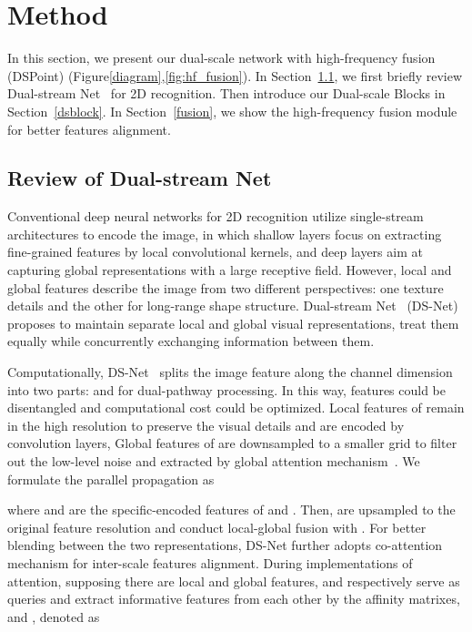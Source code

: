 \documentclass[sigconf]{acmart}
\begin{document}
\section{Method}
\label{sec:method}
In this section, we present our dual-scale network with high-frequency fusion (DSPoint) (Figure\ref{diagram},\ref{fig:hf_fusion}). In Section~\ref{dsnet}, we first briefly review Dual-stream Net~\cite{mao2021dual} for 2D recognition. Then introduce our Dual-scale Blocks in Section~\ref{dsblock}. 
In Section~\ref{fusion}, we show the high-frequency fusion module for better features alignment.

\subsection{Review of Dual-stream Net}
\label{dsnet}
Conventional deep neural networks for 2D recognition utilize single-stream architectures to encode the image, in which shallow layers focus on extracting fine-grained features by local convolutional kernels, and deep layers aim at capturing global representations with a large receptive field. However, local and global features describe the image from two different perspectives: one texture details and the other for long-range shape structure.  Dual-stream Net~\cite{mao2021dual} (DS-Net) proposes to maintain separate local and global visual representations, treat them equally while concurrently exchanging information between them. 

Computationally, DS-Net~\cite{mao2021dual} splits the image feature along the channel dimension into two parts:  and  for dual-pathway processing. In this way, features could be disentangled and computational cost could be optimized. Local features of  remain in the high resolution to preserve the visual details and are encoded by convolution layers,  Global features of   are downsampled to a smaller grid to filter out the low-level noise and extracted by global attention mechanism~\cite{bahdanau2014neural}. We formulate the parallel propagation as 

where  and  are the specific-encoded features of  and . Then,  are upsampled to the original feature resolution and conduct local-global fusion with . For better blending between the two representations, DS-Net further adopts co-attention mechanism for inter-scale features alignment. During implementations of attention, supposing there are  local and  global features,  and  respectively serve as queries and extract informative features from each other by the affinity matrixes,  and , denoted as
\end{document}
